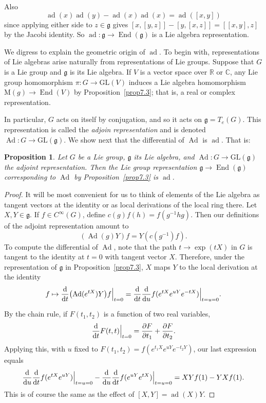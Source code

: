 \documentclass[12pt,reqno]{book}%
\newtheorem{proposition}{Proposition}[chapter]
\theoremstyle{definition}
\theoremstyle{remark}
\theoremstyle{theorem}
\theoremstyle{remark}
\DeclareMathOperator{\End}{End}
\DeclareMathOperator{\ad}{ad}
\DeclareMathOperator{\Ad}{Ad}
\begin{document}
Also
\begin{equation}\label{eq8.4}
    \ad(x)\ad(y) - \ad(x)\ad(x) = \ad([x, y])
\end{equation}
since applying either side to $z \in \mathfrak{g}$ gives $[x, [y, z]] - [y, [x, z]] = [[x, y], z]$ by the Jacobi identity.
So $\ad : \mathfrak{g} \to \End(\mathfrak{g})$ is a Lie algebra representation.

We digress to explain the geometric origin of $\ad$.
To begin with, representations of Lie algebras arise naturally from representations of Lie groups.
Suppose that $G$ is a Lie group and $\mathfrak{g}$ is its Lie algebra.
If $V$ is a vector space over $\mathbb{R}$ or $\mathbb{C}$, any Lie group homomorphism $\pi : G \to \mathrm{GL}(V)$ induces a Lie algebra homomorphism $\mathrm{M}(g) \to \End(V)$ by Proposition~\ref{prop7.3}; that is, a real or complex representation.

In particular, $G$ acts on itself by conjugation, and so it acts on $\mathfrak{g} = T_e(G)$.
This representation is called the \emph{adjoin representation} and is denoted $\Ad : G \to \mathrm{GL}(\mathfrak{g})$.
We show next that the differential of $\Ad$ is $\ad$.
That is:

\begin{proposition}\label{prop8.2}%
    Let $G$ be a Lie group, $\mathfrak{g}$ its Lie algebra, and $\Ad : G \to \mathrm{GL}(\mathfrak{g})$ the adjoint representation.
    Then the Lie group representation $\mathfrak{g} \to \End(\mathfrak{g})$ corresponding to $\Ad$ by Proposition~\ref{prop7.3} is $\ad$.
\end{proposition}%
\begin{proof}%
    It will be most convenient for us to think of elements of the Lie algebra as tangent vectors at the identity or as local derivations of the local ring there.
    Let $X, Y \in \mathfrak{g}$.
    If $f \in C^\infty(G)$, define $c(g)f(h) = f(g^{-1}hg)$.
    Then our definitions of the adjoint representation amount to
    \[
        (\Ad(g)Y)f = Y(c(g^{-1})f).
    \]
    To compute the differential of $\Ad$, note that the path $t \to \exp(tX)$ in $G$ is tangent to the identity at $t = 0$ with tangent vector $X$.
    Therefore, under the representation of $\mathfrak{g}$ in Proposition~\ref{prop7.3}, $X$ maps $Y$ to the local derivation at the identity
    \[
        f \mapsto \dv{t}(\Ad(e^{tX})Y)f \Big|_{t = 0} = \dv{t}\dv{u}f(e^{tX}e^{uY}e^{-tX})\Big|_{t = u = 0}.
    \]

    By the chain rule, if $F(t_1, t_2)$ is a function of two real variables,
    \begin{equation}\label{eq8.5}
        \dv{t}F(t, t)\Big|_{t = 0} = \pdv{F}{t_1}(0, 0) + \pdv{F}{t_2}(0, 0).
    \end{equation}
    Applying this, with $u$ fixed to $F(t_1, t_2) = f(e^{t_1 X}e^{uY} e^{-t_2 Y})$, our last expression equals
    \[
        \dv{u}\dv{t}f(e^{tX}e^{uY})\Big|_{t = u = 0} - \dv{u}\dv{t}f(e^{uY}e^{tX})\Big|_{t = u = 0} =  XY f(1) - YX f(1).
    \]
    This is of course the same as the effect of $[X, Y] = \ad(X)Y$.
\end{proof}%
\end{document}
